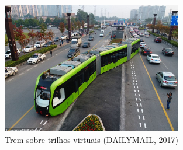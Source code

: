\begin{frame}
\begin{columns}[c]
	\begin{figure}[]
	 \centering
	 \captionsetup{width=0.7\textwidth,font=footnotesize,textfont=bf}
	 \includegraphics[width=0.7\textwidth,keepaspectratio]{Figuras/Trem.jpg}
	 \caption{Trem sobre trilhos virtuais (DAILYMAIL, 2017)}
	\end{figure}

\end{columns}
\end{frame}


